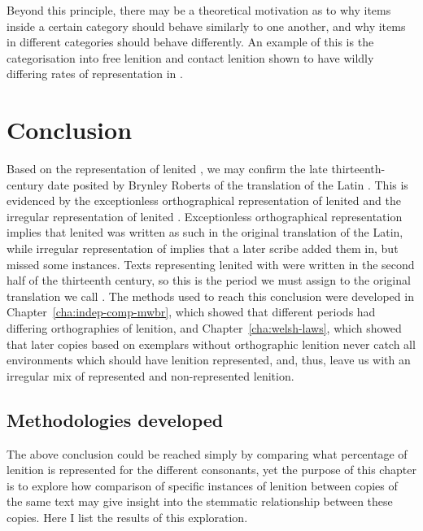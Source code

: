 Beyond this principle, there may be a theoretical motivation as to why items inside a certain category should behave similarly to one another, and why items in different categories should behave differently. An example of this is the categorisation into free lenition and contact lenition shown to have wildly differing rates of representation in .

\section{Conclusion}
\label{sec:dewi-conclusion}

Based on the representation of lenited , we may confirm the late thirteenth-century date  posited by Brynley Roberts of the translation of the Latin . This is evidenced by the exceptionless orthographical representation of lenited  and the irregular representation of lenited . Exceptionless orthographical representation implies that lenited  was written as such in the original translation of the Latin, while irregular representation of  implies that a later scribe added them in, but missed some instances. Texts representing lenited  with  were written in the second half of the thirteenth century, so this is the period we must assign to the original translation we call . The methods used to reach this conclusion were developed in Chapter~\ref{cha:indep-comp-mwbr}, which showed that different periods had differing orthographies of lenition, and Chapter~\ref{cha:welsh-laws}, which showed that later copies based on exemplars without orthographic lenition never  catch all environments which should have lenition represented, and, thus, leave us with an irregular mix of represented and non-represented lenition.

\subsection{Methodologies developed}
\label{sec:meth-devel}

The above conclusion could be reached simply by comparing what percentage of lenition is represented for the different consonants, yet the purpose of this chapter is to explore how comparison of specific instances of lenition between copies of the same text may give insight into the stemmatic relationship between these copies. Here I list the results of this exploration.

